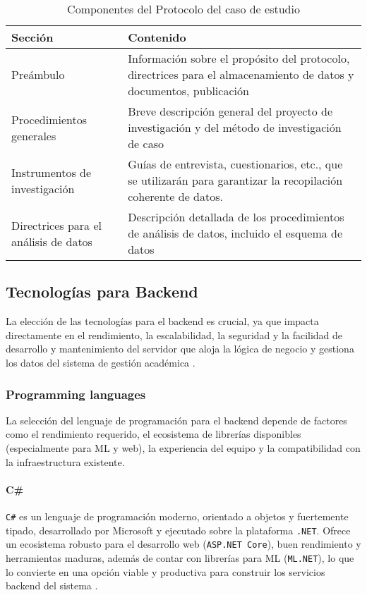 \begin{longtable}{l|p{3in}}
\caption{Componentes del Protocolo del caso de estudio} \\
\hline
Sección & Contenido \\
\hline
\endfirsthead
Preámbulo & Información sobre el propósito del protocolo, directrices para el almacenamiento de datos y documentos, publicación \\ %
Procedimientos generales & Breve descripción general del proyecto de investigación y del método de investigación de caso \\ %
Instrumentos de investigación & Guías de entrevista, cuestionarios, etc., que se utilizarán para garantizar la recopilación coherente de datos. \\ %
Directrices para el análisis de datos & Descripción detallada de los procedimientos de análisis de datos, incluido el esquema de datos \\ %
\end{longtable}


\subsection{Tecnologías para Backend}
La elección de las tecnologías para el backend es crucial, ya que impacta directamente en el rendimiento, la escalabilidad, la seguridad y la facilidad de desarrollo y mantenimiento del servidor que aloja la lógica de negocio y gestiona los datos del sistema de gestión académica \parencite{FowlerBackend}.

\subsubsection{Programming languages}
La selección del lenguaje de programación para el backend depende de factores como el rendimiento requerido, el ecosistema de librerías disponibles (especialmente para ML y web), la experiencia del equipo y la compatibilidad con la infraestructura existente.

\paragraph{C\#}
\texttt{C\#} es un lenguaje de programación moderno, orientado a objetos y fuertemente tipado, desarrollado por Microsoft y ejecutado sobre la plataforma \texttt{.NET}.
Ofrece un ecosistema robusto para el desarrollo web (\texttt{ASP.NET Core}), buen rendimiento y herramientas maduras, además de contar con librerías para ML (\texttt{ML.NET}), lo que lo convierte en una opción viable y productiva para construir los servicios backend del sistema \parencite{MicrosoftCSharp}.

